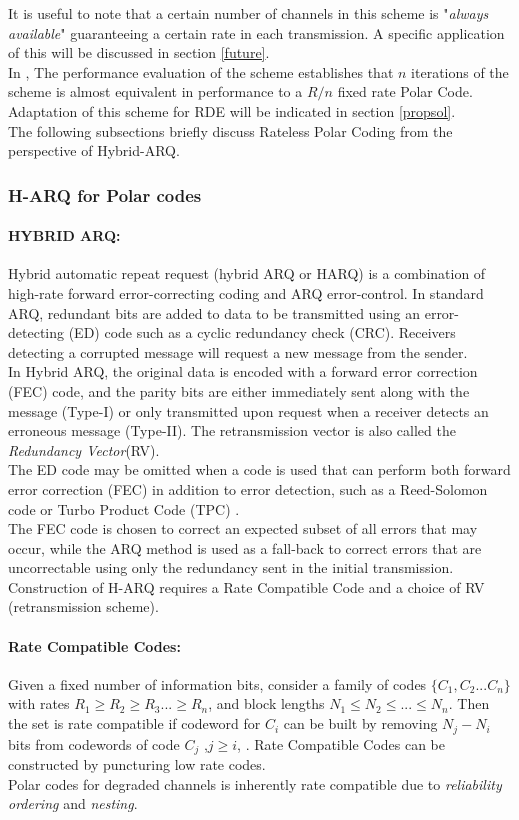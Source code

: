 \documentclass[
11pt, %
a4paper, %
oneside, %
headinclude,footinclude, %
BCOR5mm, %
]{scrartcl}
\begin{document}
It is useful to note that a certain number of channels in this scheme is "\emph{always available}" guaranteeing a certain rate in each transmission. A specific application of this will be discussed in section \ref{future}.
\\In \cite{chen}, The performance evaluation of the scheme establishes that $n$ iterations of the scheme is almost equivalent in performance to a $R/n$ fixed rate Polar Code.
\\Adaptation of this scheme for RDE will be indicated in section \ref{propsol}.
\\The following subsections briefly discuss Rateless Polar Coding from the perspective of Hybrid-ARQ.
\subsubsection{H-ARQ for Polar codes}
\paragraph{HYBRID ARQ:}Hybrid automatic repeat request (hybrid ARQ or HARQ) is a combination of high-rate forward error-correcting coding and ARQ error-control. In standard ARQ, redundant bits are added to data to be transmitted using an error-detecting (ED) code such as a cyclic redundancy check (CRC). Receivers detecting a corrupted message will request a new message from the sender. \\In Hybrid ARQ, the original data is encoded with a forward error correction (FEC) code, and the parity bits are either immediately sent along with the message (Type-I) or only transmitted upon request when a receiver detects an erroneous message (Type-II). The retransmission vector is also called the \emph{Redundancy Vector}(RV). \\The ED code may be omitted when a code is used that can perform both forward error correction (FEC) in addition to error detection, such as a Reed-Solomon code or  Turbo Product Code (TPC) \cite{harqmukhtar}.\\The FEC code is chosen to correct an expected subset of all errors that may occur, while the ARQ method is used as a fall-back to correct errors that are uncorrectable using only the redundancy sent in the initial transmission.\\Construction of H-ARQ requires a Rate Compatible Code and a choice of RV (retransmission scheme).
\paragraph{Rate Compatible Codes:}
Given a fixed number of information bits, consider a family of codes $\{C_1,C_2...C_n\}$  with rates $R_1\geq R_2\geq R_3...\geq R_n$, and block lengths $N_1 \leq N_2 \leq ... \leq N_n$.
Then the set is rate compatible if codeword for $C_i$ can be built by removing $N_j-N_i$ bits from codewords of code $C_j$ ,$j\geq i$, \cite{mondelli}. Rate Compatible Codes can be constructed by puncturing low rate codes. 
\\Polar codes for degraded channels is inherently rate compatible due to \emph{reliability ordering} and \emph{nesting}.
\end{document}
